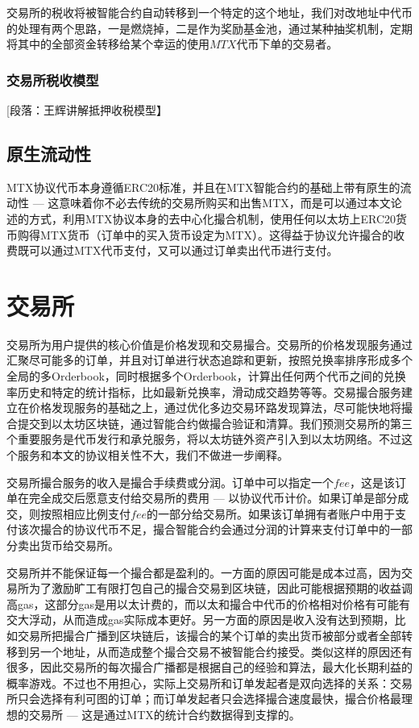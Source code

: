 \documentclass[UTF8,nofonts]{ctexart}
\begin{document}
交易所的税收将被智能合约自动转移到一个特定的这个地址，我们对改地址中代币的处理有两个思路，一是燃烧掉，二是作为奖励基金池，通过某种抽奖机制，定期将其中的全部资金转移给某个幸运的使用$MTX$代币下单的交易者。

\subsubsection{交易所税收模型\label{sec:taxmodel}}

[段落：王辉讲解抵押收税模型】

\subsection{原生流动性}

MTX协议代币本身遵循ERC20标准，并且在MTX智能合约的基础上带有原生的流动性 --- 这意味着你不必去传统的交易所购买和出售MTX，而是可以通过本文论述的方式，利用MTX协议本身的去中心化撮合机制，使用任何以太坊上ERC20货币购得MTX货币（订单中的买入货币设定为MTX）。这得益于协议允许撮合的收费既可以通过MTX代币支付，又可以通过订单卖出代币进行支付。


\section{交易所\label{sec:exchange}}

交易所为用户提供的核心价值是价格发现和交易撮合。交易所的价格发现服务通过汇聚尽可能多的订单，并且对订单进行状态追踪和更新，按照兑换率排序形成多个全局的多Orderbook，同时根据多个Orderbook，计算出任何两个代币之间的兑换率历史和特定的统计指标，比如最新兑换率，滑动成交趋势等等。交易撮合服务建立在价格发现服务的基础之上，通过优化多边交易环路发现算法，尽可能快地将撮合提交到以太坊区块链，通过智能合约做撮合验证和清算。我们预测交易所的第三个重要服务是代币发行和承兑服务，将以太坊链外资产引入到以太坊网络。不过这个服务和本文的协议相关性不大，我们不做进一步阐释。

交易所撮合服务的收入是撮合手续费或分润。订单中可以指定一个$fee$，这是该订单在完全成交后愿意支付给交易所的费用 --- 以协议代币计价。如果订单是部分成交，则按照相应比例支付$fee$的一部分给交易所。如果该订单拥有者账户中用于支付该次撮合的协议代币不足，撮合智能合约会通过分润的计算来支付订单中的一部分卖出货币给交易所。

交易所并不能保证每一个撮合都是盈利的。一方面的原因可能是成本过高，因为交易所为了激励旷工有限打包自己的撮合交易到区块链，因此可能根据预期的收益调高gas，这部分gas是用以太计费的，而以太和撮合中代币的价格相对价格有可能有交大浮动，从而造成gas实际成本更好。另一方面的原因是收入没有达到预期，比如交易所把撮合广播到区块链后，该撮合的某个订单的卖出货币被部分或者全部转移到另一个地址，从而造成整个撮合交易不被智能合约接受。类似这样的原因还有很多，因此交易所的每次撮合广播都是根据自己的经验和算法，最大化长期利益的概率游戏。不过也不用担心，实际上交易所和订单发起者是双向选择的关系：交易所只会选择有利可图的订单；而订单发起者只会选择撮合速度最快，撮合价格最理想的交易所 --- 这是通过MTX的统计合约数据得到支撑的。
\end{document}
